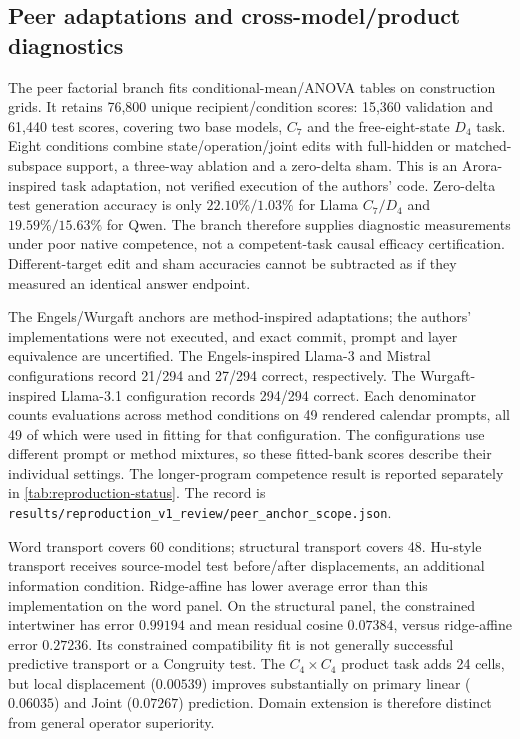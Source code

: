 \subsection{Peer adaptations and cross-model/product diagnostics}

The peer factorial branch fits conditional-mean/ANOVA tables on construction grids. It retains 76,800 unique recipient/condition scores: 15,360 validation and 61,440 test scores, covering two base models, $C_7$ and the free-eight-state $D_4$ task. Eight conditions combine state/operation/joint edits with full-hidden or matched-subspace support, a three-way ablation and a zero-delta sham. This is an Arora-inspired task adaptation, not verified execution of the authors' code. Zero-delta test generation accuracy is only $22.10\%/1.03\%$ for Llama $C_7/D_4$ and $19.59\%/15.63\%$ for Qwen. The branch therefore supplies diagnostic measurements under poor native competence, not a competent-task causal efficacy certification. Different-target edit and sham accuracies cannot be subtracted as if they measured an identical answer endpoint.

The Engels/Wurgaft anchors are method-inspired adaptations; the authors' implementations were not executed, and exact commit, prompt and layer equivalence are uncertified. The Engels-inspired Llama-3 and Mistral configurations record 21/294 and 27/294 correct, respectively. The Wurgaft-inspired Llama-3.1 configuration records 294/294 correct. Each denominator counts evaluations across method conditions on 49 rendered calendar prompts, all 49 of which were used in fitting for that configuration. The configurations use different prompt or method mixtures, so these fitted-bank scores describe their individual settings. The longer-program competence result is reported separately in \cref{tab:reproduction-status}. The record is \texttt{results/reproduction\_v1\_review/peer\_anchor\_scope.json}.

Word transport covers 60 conditions; structural transport covers 48. Hu-style transport receives source-model test before/after displacements, an additional information condition. Ridge-affine has lower average error than this implementation on the word panel. On the structural panel, the constrained intertwiner has error $0.99194$ and mean residual cosine $0.07384$, versus ridge-affine error $0.27236$. Its constrained compatibility fit is not generally successful predictive transport or a Congruity test. The $C_4\times C_4$ product task adds 24 cells, but local displacement ($0.00539$) improves substantially on primary linear ($0.06035$) and Joint ($0.07267$) prediction. Domain extension is therefore distinct from general operator superiority.

